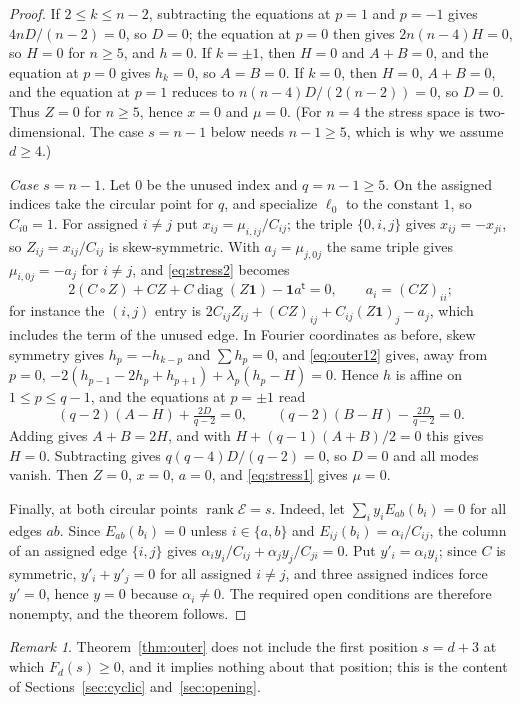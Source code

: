 \documentclass{amsart}
\theoremstyle{definition}
\theoremstyle{remark}
\newtheorem{remark}[theorem]{Remark}
\numberwithin{equation}{section}
\DeclareMathOperator{\rank}{rank}
\begin{document}
\begin{proof}
If $2\le k\le n-2$, subtracting the equations at $p=1$ and $p=-1$ gives
$4nD/(n-2)=0$, so $D=0$; the equation at $p=0$ then gives $2n(n-4)H=0$, so $H=0$ for
$n\ge5$, and $h=0$. If $k=\pm1$, then $H=0$ and $A+B=0$, and the equation at $p=0$
gives $h_k=0$, so $A=B=0$. If $k=0$, then $H=0$, $A+B=0$, and the equation at $p=1$
reduces to $n(n-4)D/(2(n-2))=0$, so $D=0$. Thus $Z=0$ for $n\ge5$, hence $x=0$ and
$\mu=0$. (For $n=4$ the stress space is two-dimensional. The case $s=n-1$ below needs
$n-1\ge5$, which is why we assume $d\ge4$.)

\emph{Case $s=n-1$.} Let $0$ be the unused index and $q=n-1\ge5$. On the assigned
indices take the circular point for $q$, and specialize $\ell_0$ to the constant
$1$, so $C_{i0}=1$. For assigned $i\ne j$ put $x_{ij}=\mu_{i,ij}/C_{ij}$; the triple
$\{0,i,j\}$ gives $x_{ij}=-x_{ji}$, so $Z_{ij}=x_{ij}/C_{ij}$ is skew-symmetric. With
$a_j=\mu_{j,0j}$ the same triple gives $\mu_{i,0j}=-a_j$ for $i\ne j$, and
\eqref{eq:stress2} becomes
\begin{equation}\label{eq:outer12}
  2(C\circ Z)+CZ+C\operatorname{diag}(Z\mathbf1)-\mathbf1a^{\mathsf t}=0,\qquad
  a_i=(CZ)_{ii};
\end{equation}
for instance the $(i,j)$ entry is $2C_{ij}Z_{ij}+(CZ)_{ij}+C_{ij}(Z\mathbf1)_j-a_j$,
which includes the term of the unused edge. In Fourier coordinates as before, skew
symmetry gives $h_p=-h_{k-p}$ and $\sum h_p=0$, and \eqref{eq:outer12} gives, away
from $p=0$, $-2(h_{p-1}-2h_p+h_{p+1})+\lambda_p(h_p-H)=0$. Hence $h$ is affine on
$1\le p\le q-1$, and the equations at $p=\pm1$ read
\[
  (q-2)(A-H)+\tfrac{2D}{q-2}=0,\qquad (q-2)(B-H)-\tfrac{2D}{q-2}=0 .
\]
Adding gives $A+B=2H$, and with $H+(q-1)(A+B)/2=0$ this gives $H=0$. Subtracting
gives $q(q-4)D/(q-2)=0$, so $D=0$ and all modes vanish. Then $Z=0$, $x=0$, $a=0$, and
\eqref{eq:stress1} gives $\mu=0$.

Finally, at both circular points $\rank\mathcal E=s$. Indeed, let $\sum_iy_iE_{ab}(b_i)=0$
for all edges $ab$. Since $E_{ab}(b_i)=0$ unless $i\in\{a,b\}$ and
$E_{ij}(b_i)=\alpha_i/C_{ij}$, the column of an assigned edge $\{i,j\}$ gives
$\alpha_iy_i/C_{ij}+\alpha_jy_j/C_{ji}=0$. Put $y'_i=\alpha_iy_i$; since $C$ is
symmetric, $y'_i+y'_j=0$ for all assigned $i\ne j$, and three assigned indices force
$y'=0$, hence $y=0$ because $\alpha_i\ne0$. The required open conditions are therefore
nonempty, and the theorem follows.
\end{proof}

\begin{remark}\label{rem:outer}
Theorem~\ref{thm:outer} does not include the first position $s=d+3$ at which
$F_d(s)\ge0$, and it implies nothing about that position; this is the content of
Sections~\ref{sec:cyclic} and~\ref{sec:opening}.
\end{remark}
\end{document}
